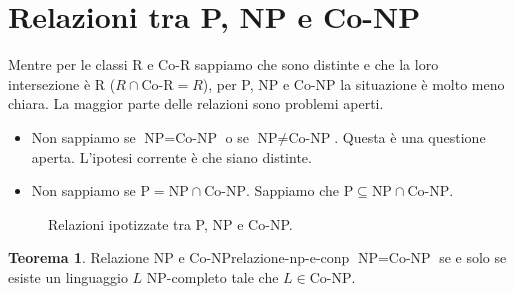 \documentclass[a4paper]{article}
\theoremstyle{definition} %
\newtheorem{theorem}{Teorema}
\begin{document}
\section{Relazioni tra P, NP e Co-NP}

Mentre per le classi R e Co-R sappiamo che sono distinte e che la loro intersezione è R ($R \cap \text{Co-R} = R$), per P, NP e Co-NP la situazione è molto meno chiara. La maggior parte delle relazioni sono problemi aperti.

\begin{itemize}
    \item Non sappiamo se $\text{NP} = \text{Co-NP}$ o se $\text{NP} \neq \text{Co-NP}$. Questa è una questione aperta. L'ipotesi corrente è che siano distinte.
    \item Non sappiamo se $\text{P} = \text{NP} \cap \text{Co-NP}$. Sappiamo che $\text{P} \subseteq \text{NP} \cap \text{Co-NP}$.
\end{itemize}

\begin{figure}[h]
\centering
{}
\caption{Relazioni ipotizzate tra P, NP e Co-NP.}
\end{figure}

\begin{theorem}{Relazione NP e Co-NP}{relazione-np-e-conp}
$\text{NP} = \text{Co-NP}$ se e solo se esiste un linguaggio $L$ NP-completo tale che $L \in \text{Co-NP}$.
\end{theorem}
\end{document}
